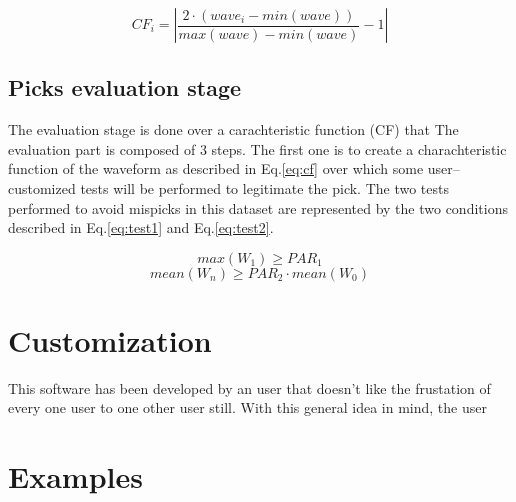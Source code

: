 \documentclass[11pt,a4paper,twocolumns]{article}
\begin{document}
\begin{equation}
	CF_{i}= \left|\frac{2\cdot(wave_{i}-min(wave))}{max(wave)-min(wave)}-1\right|
	\label{eq:cf}
\end{equation}



\subsection{Picks evaluation stage}
The evaluation stage is done over a carachteristic function (CF) that
The evaluation part is composed of \num{3} steps. The first one is to create a charachteristic function of the waveform as described in Eq.\ref{eq:cf} over which some user--customized tests will be performed to legitimate the pick. The two tests performed to avoid mispicks in this dataset are represented by the two conditions described  in Eq.\ref{eq:test1} and Eq.\ref{eq:test2}.

\begin{equation}
	max(W_{1}) \geqslant PAR_{1}
	\label{eq:test1}
\end{equation}
%
\begin{equation}
	mean(W_{n}) \geqslant PAR_{2} \cdot mean(W_{0})
	\label{eq:test2}
\end{equation}


\section{Customization}
\label{sec:custom}
This software has been developed by an user that doesn't like the frustation of every  one user to one other user still. With this general idea in mind, the user 

\section{Examples}



\end{document}

